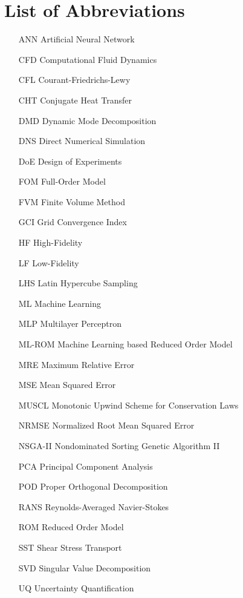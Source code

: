 \chapter*{List of Abbreviations}

\begin{itemize}
\item[ANN] Artificial Neural Network
\item[CFD] Computational Fluid Dynamics
\item[CFL] Courant-Friedrichs-Lewy
\item[CHT] Conjugate Heat Transfer
\item[DMD] Dynamic Mode Decomposition
\item[DNS] Direct Numerical Simulation
\item[DoE] Design of Experiments
\item[FOM] Full-Order Model
\item[FVM] Finite Volume Method
\item[GCI] Grid Convergence Index
\item[HF] High-Fidelity
\item[LF] Low-Fidelity
\item[LHS] Latin Hypercube Sampling
\item[ML] Machine Learning
\item[MLP] Multilayer Perceptron
\item[ML-ROM] Machine Learning based Reduced Order Model
\item[MRE] Maximum Relative Error
\item[MSE] Mean Squared Error
\item[MUSCL] Monotonic Upwind Scheme for Conservation Laws
\item[NRMSE] Normalized Root Mean Squared Error
\item[NSGA-II] Nondominated Sorting Genetic Algorithm II
\item[PCA] Principal Component Analysis
\item[POD] Proper Orthogonal Decomposition
\item[RANS] Reynolds-Averaged Navier-Stokes
\item[ROM] Reduced Order Model
\item[SST] Shear Stress Transport
\item[SVD] Singular Value Decomposition
\item[UQ] Uncertainty Quantification
\end{itemize}
